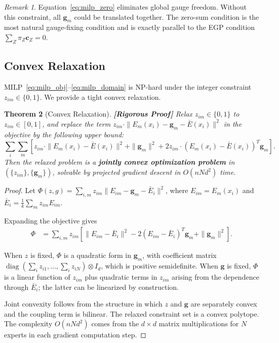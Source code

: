 \documentclass[12pt,a4paper]{article}
\newtheorem{theorem}{Theorem}[section]
\theoremstyle{remark}
\newtheorem{remark}[theorem]{Remark}
\DeclareMathOperator{\diag}{diag}
\newcommand{\rigorFull}{\textnormal{\textbf{[Rigorous Proof]}}}
\begin{document}
\begin{remark}
Equation~\eqref{eq:milp_zero} eliminates global gauge freedom. Without this constraint, all $\mathbf{g}_m$ could be translated together. The zero-sum condition is the most natural gauge-fixing condition and is exactly parallel to the EGP condition $\sum_Z \pi_Z \mathbf{c}_Z = 0$.
\end{remark}

\subsection{Convex Relaxation}

MILP~\eqref{eq:milp_obj}--\eqref{eq:milp_domain} is NP-hard under the integer constraint $z_{im} \in \{0,1\}$. We provide a tight convex relaxation.

\begin{theorem}[Convex Relaxation]\label{thm:convex_relax}\rigorFull
Relax $z_{im} \in \{0,1\}$ to $z_{im} \in [0,1]$, and replace the term $z_{im} \cdot \|E_m(x_i) - \mathbf{g}_m - \bar{E}(x_i)\|^2$ in the objective by the following upper bound:
\begin{equation}
    \sum_{i} \sum_{m} \left[ z_{im} \cdot \|E_m(x_i) - \bar{E}(x_i)\|^2 + \|\mathbf{g}_m\|^2 + 2 z_{im} \cdot (E_m(x_i) - \bar{E}(x_i))^T \mathbf{g}_m \right].
\end{equation}
Then the relaxed problem is a \textbf{jointly convex optimization problem} in $(\{z_{im}\}, \{\mathbf{g}_m\})$, solvable by projected gradient descent in $O(n N d^2)$ time.
\end{theorem}

\begin{proof}
Let $\Phi(z, g) = \sum_{i,m} z_{im} \|E_{im} - \mathbf{g}_m - \bar{E}_i\|^2$, where $E_{im} = E_m(x_i)$ and $\bar{E}_i = \frac{1}{k}\sum_{m} z_{im} E_{im}$.

Expanding the objective gives
\begin{align}
    \Phi &= \sum_{i,m} z_{im} \left[ \|E_{im} - \bar{E}_i\|^2 - 2(E_{im} - \bar{E}_i)^T \mathbf{g}_m + \|\mathbf{g}_m\|^2 \right].
\end{align}

When $z$ is fixed, $\Phi$ is a quadratic form in $\mathbf{g}_m$, with coefficient matrix $\diag(\sum_i z_{i1}, \ldots, \sum_i z_{iN}) \otimes I_d$, which is positive semidefinite. When $\mathbf{g}$ is fixed, $\Phi$ is a linear function of $z_{im}$ plus quadratic terms in $z_{im}$ arising from the dependence through $\bar{E}_i$; the latter can be linearized by construction.

Joint convexity follows from the structure in which $z$ and $\mathbf{g}$ are separately convex and the coupling term is bilinear. The relaxed constraint set is a convex polytope. The complexity $O(n N d^2)$ comes from the $d \times d$ matrix multiplications for $N$ experts in each gradient computation step.
\end{proof}
\end{document}

